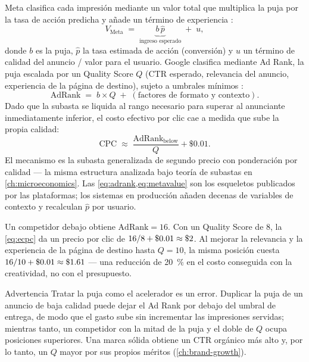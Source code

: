 Meta clasifica cada impresión mediante un valor total que multiplica la puja por la tasa de acción predicha y añade un término de experiencia \parencite{metadev-advantage-campaigns}:
\begin{equation}\label{eq:metavalue}
  V_{\text{Meta}} \;=\; \underbrace{b\,\hat p}_{\text{ingreso esperado}} \;+\; u,
\end{equation}
donde $b$ es la puja, $\hat p$ la tasa estimada de acción (conversión) y $u$ un término de calidad del anuncio / valor para el usuario. Google clasifica mediante Ad Rank, la puja escalada por un Quality Score $Q$ (CTR esperado, relevancia del anuncio, experiencia de la página de destino), sujeto a umbrales mínimos \parencite{gads1722122,gads7634668}:
\begin{equation}\label{eq:adrank}
  \mathrm{AdRank} \;=\; b \times Q \;+\;(\text{factores de formato y contexto}).
\end{equation}
Dado que la subasta se liquida al rango necesario para superar al anunciante inmediatamente inferior, el costo efectivo por clic cae a medida que sube la propia calidad:
\begin{equation}\label{eq:ecpc}
  \mathrm{CPC} \;\approx\; \frac{\mathrm{AdRank}_{\text{below}}}{Q} + \$0.01 .
\end{equation}
El mecanismo es la subasta generalizada de segundo precio con ponderación por calidad --- la misma estructura analizada bajo teoría de subastas en \cref{ch:microeconomics}. Las \cref{eq:adrank,eq:metavalue} son los esqueletos publicados por las plataformas; los sistemas en producción añaden decenas de variables de contexto y recalculan $\hat p$ por usuario.

\begin{example}
Un competidor debajo obtiene $\mathrm{AdRank}=16$. Con un Quality Score de $8$, la \cref{eq:ecpc} da un precio por clic de $16/8+\$0.01\approx\$\num{2}$. Al mejorar la relevancia y la experiencia de la página de destino hasta $Q=10$, la misma posición cuesta $16/10+\$0.01\approx\$\num{1}.61$ --- una reducción de \qty{20}{\percent} en el costo conseguida con la creatividad, no con el presupuesto.
\end{example}

\begin{admonition}{Advertencia}
Tratar la puja como el acelerador es un error. Duplicar la puja de un anuncio de baja calidad puede dejar el Ad Rank por debajo del umbral de entrega, de modo que el gasto sube sin incrementar las impresiones servidas; mientras tanto, un competidor con la mitad de la puja y el doble de $Q$ ocupa posiciones superiores. Una marca sólida obtiene un CTR orgánico más alto y, por lo tanto, un $Q$ mayor por sus propios méritos (\cref{ch:brand-growth}).
\end{admonition}

